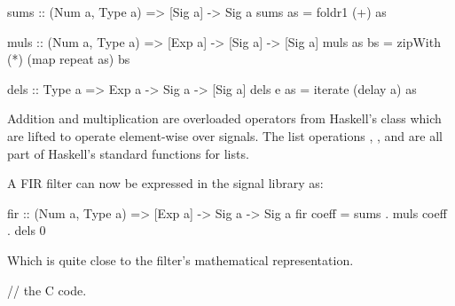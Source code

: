 \documentclass[../main.tex]{subfiles}
\begin{document}
\begin{code}
sums :: (Num a, Type a) => [Sig a] -> Sig a
sums as = foldr1 (+) as

muls :: (Num a, Type a) => [Exp a] -> [Sig a] -> [Sig a]
muls as bs = zipWith (*) (map repeat as) bs

dels :: Type a => Exp a -> Sig a -> [Sig a]
dels e as = iterate (delay a) as
\end{code}

\noindent Addition and multiplication are overloaded operators from Haskell's  class which are lifted to operate element-wise over signals. The list operations , , and  are all part of Haskell's standard functions for lists.

A FIR filter can now be expressed in the signal library as:

\begin{code}
fir :: (Num a, Type a) => [Exp a] -> Sig a -> Sig a
fir coeff = sums . muls coeff . dels 0
\end{code}

\noindent Which is quite close to the filter's mathematical representation.


\begin{code}
// the C code.
\end{code}
\end{document}
